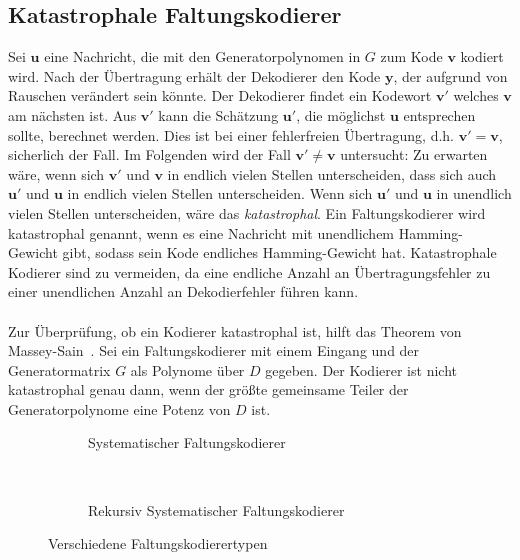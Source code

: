 \subsection{Katastrophale Faltungskodierer}
\label{kapitel:grundlagen_katastrophale_kodierer}
Sei $\mathbf{u}$ eine Nachricht, die mit den Generatorpolynomen in $G$ zum Kode $\mathbf{v}$ kodiert wird. Nach der Übertragung erhält der Dekodierer den Kode $\mathbf{y}$, der aufgrund von Rauschen verändert sein könnte. Der Dekodierer findet ein Kodewort $\mathbf{v'}$ welches $\mathbf{v}$ am nächsten ist. Aus $\mathbf{v'}$ kann die Schätzung $\mathbf{u'}$, die möglichst $\mathbf{u}$ entsprechen sollte, berechnet werden. Dies ist bei einer fehlerfreien Übertragung, d.h. $\mathbf{v'}=\mathbf{v}$, sicherlich der Fall. Im Folgenden wird der Fall $\mathbf{v'}\neq\mathbf{v}$ untersucht: Zu erwarten wäre, wenn sich $\mathbf{v'}$ und $\mathbf{v}$ in endlich vielen Stellen unterscheiden, dass sich auch $\mathbf{u'}$ und $\mathbf{u}$ in endlich vielen Stellen unterscheiden. Wenn sich $\mathbf{u'}$ und $\mathbf{u}$ in unendlich vielen Stellen unterscheiden, wäre das \emph{katastrophal}. Ein Faltungskodierer wird katastrophal genannt, wenn es eine Nachricht mit unendlichem Hamming-Gewicht gibt, sodass sein Kode endliches Hamming-Gewicht hat. Katastrophale Kodierer sind zu vermeiden, da eine endliche Anzahl an Übertragungsfehler zu einer unendlichen Anzahl an Dekodierfehler führen kann.~\cite[S.~569]{huffman2010fundamentals}
\\
\\
Zur Überprüfung, ob ein Kodierer katastrophal ist, hilft das Theorem von Massey-Sain~\cite[S.~570]{huffman2010fundamentals}. Sei ein Faltungskodierer mit einem Eingang und der Generatormatrix $G$ als Polynome über $D$ gegeben. Der Kodierer ist nicht katastrophal genau dann, wenn der größte gemeinsame Teiler der Generatorpolynome eine Potenz von $D$ ist.
\begin{figure}[t]
	\centering
	\begin{subfigure}{0.45\textwidth}
		\centering
		\resizebox{0.90\textwidth}{!}{%
			
		}
		\caption{Systematischer Faltungskodierer}
		\label{abb:systematischer_kodierer}
	\end{subfigure}
	~ %
	\begin{subfigure}{0.45\textwidth}
		\centering
		\resizebox{0.99\textwidth}{!}{%
			
		}
		\caption{Rekursiv Systematischer Faltungskodierer}
		\label{abb:rsc_kodierer}
	\end{subfigure}
\caption{Verschiedene Faltungskodierertypen}
\label{abb:faltungskodierer_typen}
\end{figure}

